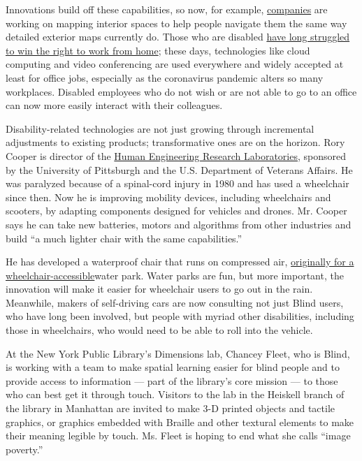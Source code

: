 Innovations build off these capabilities, so now, for example,
\href{https://www.accessexplorer.net/mapping/}{companies} are working on
mapping interior spaces to help people navigate them the same way
detailed exterior maps currently do. Those who are disabled
\href{https://www.nytimes3xbfgragh.onion/2020/05/27/at-home/work-from-home-history.html}{have
long struggled to win the right to work from home}; these days,
technologies like cloud computing and video conferencing are used
everywhere and widely accepted at least for office jobs, especially as
the coronavirus pandemic alters so many workplaces. Disabled employees
who do not wish or are not able to go to an office can now more easily
interact with their colleagues.

Disability-related technologies are not just growing through incremental
adjustments to existing products; transformative ones are on the
horizon. Rory Cooper is director of the
\href{https://www.herl.pitt.edu/}{Human Engineering Research
Laboratories}, sponsored by the University of Pittsburgh and the U.S.
Department of Veterans Affairs. He was paralyzed because of a
spinal-cord injury in 1980 and has used a wheelchair since then. Now he
is improving mobility devices, including wheelchairs and scooters, by
adapting components designed for vehicles and drones. Mr. Cooper says he
can take new batteries, motors and algorithms from other industries and
build ``a much lighter chair with the same capabilities.''

He has developed a waterproof chair that runs on compressed air,
\href{https://www.nytimes3xbfgragh.onion/2017/12/05/opinion/morgans-wonderland-waterpark-kids-play.html}{originally
for a wheelchair-accessible}water park. Water parks are fun, but more
important, the innovation will make it easier for wheelchair users to go
out in the rain. Meanwhile, makers of self-driving cars are now
consulting not just Blind users, who have long been involved, but people
with myriad other disabilities, including those in wheelchairs, who
would need to be able to roll into the vehicle.

At the New York Public Library's Dimensions lab, Chancey Fleet, who is
Blind, is working with a team to make spatial learning easier for blind
people and to provide access to information --- part of the library's
core mission --- to those who can best get it through touch. Visitors to
the lab in the Heiskell branch of the library in Manhattan are invited
to make 3-D printed objects and tactile graphics, or graphics embedded
with Braille and other textural elements to make their meaning legible
by touch. Ms. Fleet is hoping to end what she calls ``image poverty.''

